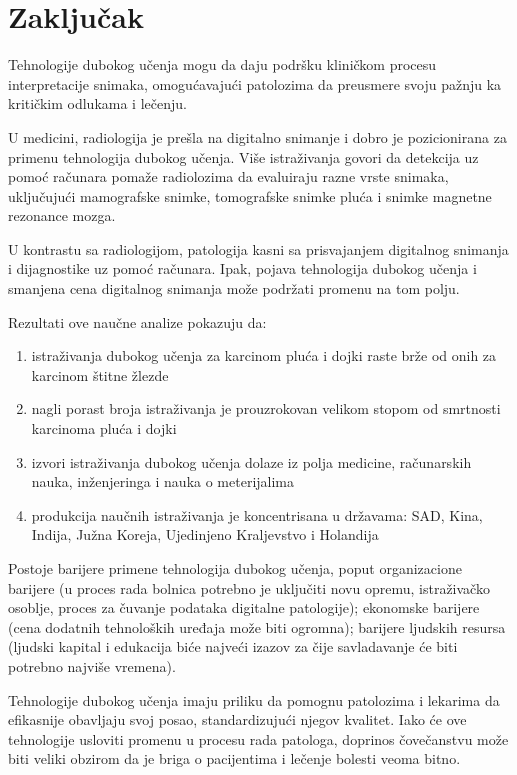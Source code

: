 \documentclass[a4paper]{article}
\begin{document}
\newpage
\section{Zaključak}
\label{sec:diskusija}

Tehnologije dubokog učenja mogu da daju podršku kliničkom procesu interpretacije snimaka, omogućavajući patolozima da preusmere svoju pažnju ka kritičkim odlukama i lečenju.

U medicini, radiologija je prešla na digitalno snimanje i dobro je pozicionirana za primenu tehnologija dubokog učenja. Više istraživanja govori da detekcija uz pomoć računara pomaže radiolozima da evaluiraju razne vrste snimaka, uključujući mamografske snimke, tomografske snimke pluća i snimke magnetne rezonance mozga.

U kontrastu sa radiologijom, patologija kasni sa prisvajanjem digitalnog snimanja i dijagnostike uz pomoć računara. Ipak, pojava tehnologija dubokog učenja i smanjena cena digitalnog snimanja može podržati promenu na tom polju.

Rezultati ove naučne analize pokazuju da:

\begin{enumerate}
  \item istraživanja dubokog učenja za karcinom pluća i dojki raste brže od onih za karcinom štitne žlezde
  \item nagli porast broja istraživanja je prouzrokovan velikom stopom od smrtnosti karcinoma pluća i dojki
  \item izvori istraživanja dubokog učenja dolaze iz polja medicine, računarskih nauka, inženjeringa i nauka o meterijalima
  \item produkcija naučnih istraživanja je koncentrisana u državama: SAD, Kina, Indija, Južna Koreja, Ujedinjeno Kraljevstvo i Holandija
\end{enumerate} 

Postoje barijere primene tehnologija dubokog učenja, poput organizacione barijere (u proces rada bolnica potrebno je uključiti novu opremu, istraživačko osoblje, proces za čuvanje podataka digitalne patologije); ekonomske barijere (cena dodatnih tehnoloških uređaja može biti ogromna);
barijere ljudskih resursa (ljudski kapital i edukacija biće najveći izazov za čije savladavanje će biti potrebno najviše vremena).


Tehnologije dubokog učenja imaju priliku da pomognu patolozima i lekarima da efikasnije obavljaju svoj posao, standardizujući njegov kvalitet. Iako će ove tehnologije usloviti promenu u procesu rada patologa, doprinos čovečanstvu može biti veliki obzirom da je briga o pacijentima i lečenje bolesti veoma bitno.
\end{document}

